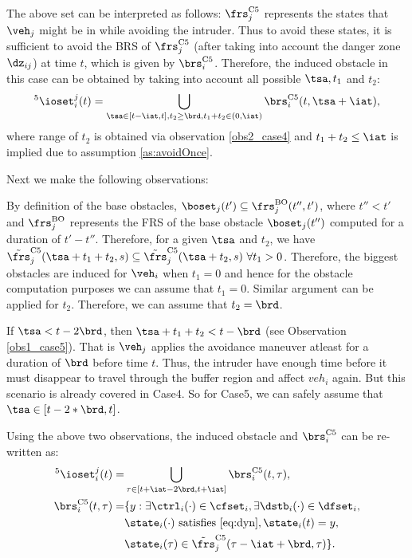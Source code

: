 The above set can be interpreted as follows: $\frs_j^{\text{C5}}$ represents the states that $\veh_j$ might be in while avoiding the intruder. Thus to avoid these states, it is sufficient to avoid the BRS of $\frs_j^{\text{C5}}$ (after taking into account the danger zone $\dz_{ij}$) at time $t$, which is given by $\brs^{\text{C5}}_{i}$. Therefore, the induced obstacle in this case can be obtained by taking into account all possible $\tsa, t_1$ and $t_2$:
\begin{equation} \label{eq:intruderObs_case5_alt1} 
^5\ioset_i^j(t) = \bigcup_{\tsa \in [t-\iat, t], t_2 \geq \brd, t_1 + t_2 \in (0, \iat)} \brs^{\text{C5}}_{i}(t, \tsa + \iat),
\end{equation}
where range of $t_2$ is obtained via observation \ref{obs2_case4} and $t_1 + t_2 \leq \iat$ is implied due to assumption \ref{as:avoidOnce}.

Next we make the following observations:
\begin{observation} \label{obs1_case5}
By definition of the base obstacles, $\boset_j(t') \subseteq \frs_j^{\text{BO}}(t'', t')$, where $t'' < t'$ and $\frs_j^{\text{BO}}$ represents the FRS of the base obstacle $\boset_j(t'')$ computed for a duration of $t' - t''$. Therefore, for a given $\tsa$ and $t_2$, we have $\tilde{\frs}_j^{\text{C5}}(\tsa+t_1+t_2, s) \subseteq \tilde{\frs}_j^{\text{C5}}(\tsa+t_2, s) ~\forall t_1 >0$. Therefore, the biggest obstacles are induced for $\veh_i$ when $t_1 = 0$ and hence for the obstacle computation purposes we can assume that $t_1 = 0$. Similar argument can be applied for $t_2$. Therefore, we can assume that $t_2 = \brd$. 
\end{observation}

\begin{observation} \label{obs2_case5}
If $\tsa < t- 2\brd$, then $\tsa + t_1 + t_2 < t - \brd$ (see Observation \ref{obs1_case5}). That is $\veh_j$ applies the avoidance maneuver atleast for a duration of $\brd$ before time $t$. Thus, the intruder have enough time before it must disappear to travel through the buffer region and affect $veh_i$ again. But this scenario is already covered in Case4. So for Case5, we can safely assume that $\tsa \in [t-2*\brd, t]$. 
\end{observation}
Using the above two observations, the induced obstacle and $\brs^{\text{C5}}_{i}$ can be re-written as:
\begin{equation} \label{eq:intruderObs_case5} 
\begin{aligned}
^5\ioset_i^j(t) = & \bigcup_{\tau \in [t+\iat -2\brd, t+\iat]} \brs^{\text{C5}}_{i}(t, \tau),\\
\brs^{\text{C5}}_{i}(t, \tau) = & \{y: \exists \ctrl_i(\cdot) \in \cfset_i, \exists \dstb_i(\cdot) \in \dfset_i, \\
& \state_i(\cdot) \text{ satisfies \eqref{eq:dyn}}, \state_i(t) = y, \\
& \state_i(\tau) \in \tilde{\frs}_j^{\text{C5}}(\tau-\iat+\brd, \tau)\}.
\end{aligned}
\end{equation}